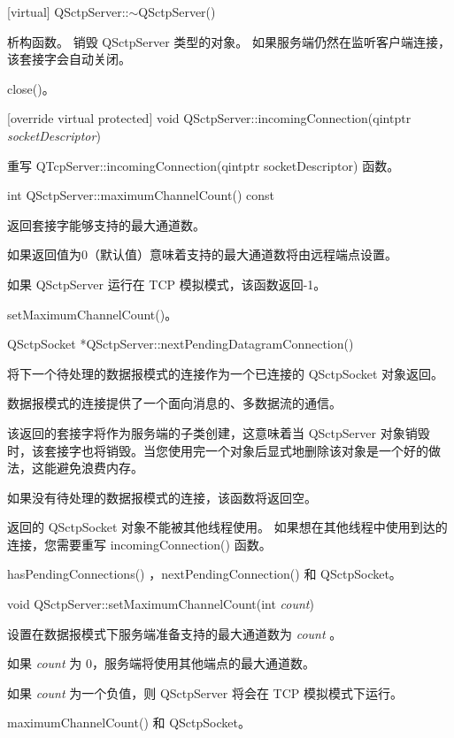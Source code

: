 [virtual] QSctpServer::$\sim$QSctpServer()

析构函数。
销毁 QSctpServer 类型的对象。
如果服务端仍然在监听客户端连接，该套接字会自动关闭。


\begin{seeAlso}
close()。
\end{seeAlso}

[override virtual protected] void QSctpServer::incomingConnection(qintptr \emph{socketDescriptor})

重写 QTcpServer::incomingConnection(qintptr socketDescriptor) 函数。

int QSctpServer::maximumChannelCount() const

返回套接字能够支持的最大通道数。

如果返回值为0（默认值）意味着支持的最大通道数将由远程端点设置。

如果 QSctpServer 运行在 TCP 模拟模式，该函数返回-1。

\begin{seeAlso}
setMaximumChannelCount()。
\end{seeAlso}

QSctpSocket *QSctpServer::nextPendingDatagramConnection()

将下一个待处理的数据报模式的连接作为一个已连接的 QSctpSocket 对象返回。

数据报模式的连接提供了一个面向消息的、多数据流的通信。

该返回的套接字将作为服务端的子类创建，这意味着当 QSctpServer 对象销毁时，该套接字也将销毁。当您使用完一个对象后显式地删除该对象是一个好的做法，这能避免浪费内存。

如果没有待处理的数据报模式的连接，该函数将返回空。

\begin{notice}
返回的 QSctpSocket 对象不能被其他线程使用。
如果想在其他线程中使用到达的连接，您需要重写 incomingConnection() 函数。
\end{notice}

\begin{seeAlso}
hasPendingConnections() ，nextPendingConnection() 和 QSctpSocket。
\end{seeAlso}

void QSctpServer::setMaximumChannelCount(int \emph{count})

设置在数据报模式下服务端准备支持的最大通道数为 \emph{count} 。

如果 \emph{count} 为 0，服务端将使用其他端点的最大通道数。

如果 \emph{count} 为一个负值，则 QSctpServer 将会在 TCP 模拟模式下运行。

\begin{seeAlso}
maximumChannelCount() 和 QSctpSocket。
\end{seeAlso}
